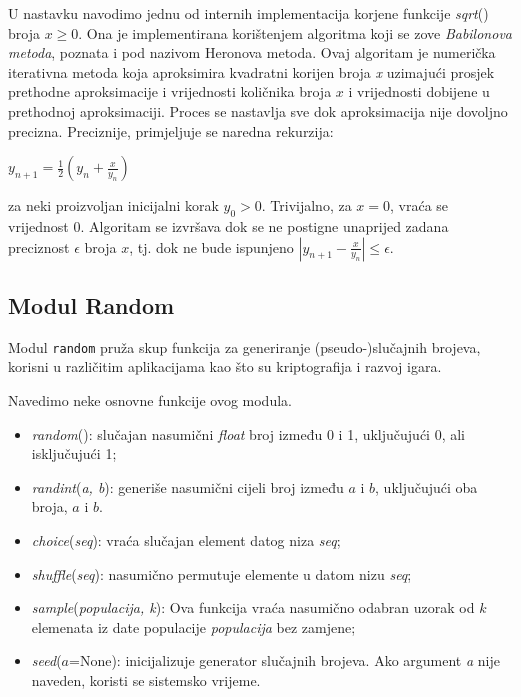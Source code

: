 U nastavku navodimo jednu od internih implementacija korjene funkcije \textit{sqrt}() broja $x\geq 0$. Ona je implementirana  korištenjem algoritma koji se zove \textit{Babilonova metoda}, poznata i pod nazivom Heronova metoda. Ovaj algori\-tam je numerička iterativna metoda koja aproksimira kvadratni korijen broja \textit{x} uzimajući prosjek prethodne aproksimacije i vrijednosti količnika broja $x$ i vrijednosti dobijene u prethodnoj aproksimaciji. Proces se nastavlja sve dok aproksimacija nije dovoljno precizna. Preciznije, primjeljuje se naredna rekurzija:
\begin{center}
	$y_{n+1}= \frac{1}{2}(y_n + \frac{x}{y_n})$
\end{center}
za neki proizvoljan inicijalni korak $y_0> 0$. Trivijalno, za $x=0$, vraća se vrijednost 0. Algoritam se izvršava dok se ne postigne unaprijed zadana preciznost $\epsilon$ broja $x$, tj. dok ne bude ispunjeno $|y_{n+1} - \frac{x}{y_n}| \leq \epsilon$. 
\subsection{Modul Random}

Modul \texttt{random}  pruža skup funkcija za generiranje (pseudo-)slučajnih brojeva,   korisni u različitim aplikacijama kao što su  kriptografija i razvoj igara.

Navedimo neke osnovne funkcije ovog modula.

\begin{itemize}
	\item   \textit{random}():  slučajan nasumični \textit{float} broj između 0 i 1, uključujući 0, ali isključujući 1;
	\item \textit{randint}(\emph{a, b}):  generiše nasumični cijeli broj između $a$ i $b$, uključujući oba broja,  $a$ i $b$.
	\item  \textit{choice}(\emph{seq}):  vraća slučajan element datog niza \textit{seq}; 
	\item \textit{shuffle}(\emph{seq}): nasumično permutuje elemente u datom nizu \textit{seq};
	\item \textit{sample}(\emph{populacija, k}): Ova funkcija vraća nasumično odabran uzorak od $k$ elemenata iz date populacije  \textit{populacija} bez zamjene;
	\item \textit{seed}($a$=None): inicijalizuje generator slučajnih brojeva. Ako argument \textit{a} nije naveden, koristi se sistemsko vrijeme.
 
\end{itemize}

